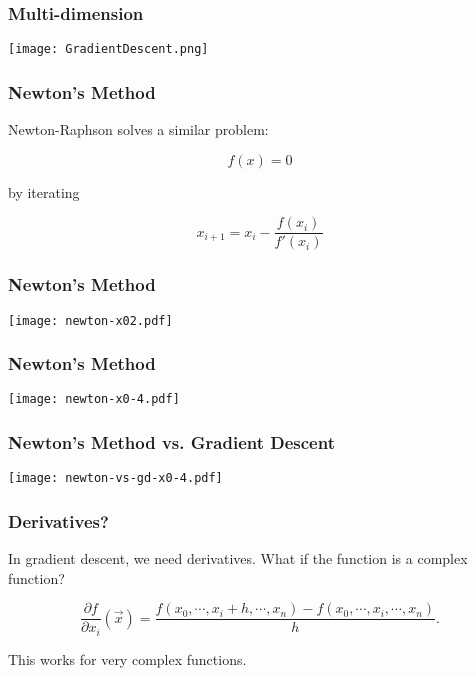 \begin{frame}[fragile]
\frametitle{Multi-dimension}

\centering
\texttt{[image: GradientDescent.png]}

\end{frame}

\begin{frame}[fragile]
\frametitle{Newton's Method}

Newton-Raphson solves a similar problem:

\[
f(x) = 0
\]

by iterating

\[
x_{i+1} = x_i - \frac{f(x_i)}{f'(x_{i})}
\]


\end{frame}

\begin{frame}[fragile]
\frametitle{Newton's Method}

\centering
\texttt{[image: newton-x02.pdf]}

\end{frame}

\begin{frame}[fragile]
\frametitle{Newton's Method}

\centering
\texttt{[image: newton-x0-4.pdf]}

\end{frame}

\begin{frame}[fragile]
\frametitle{Newton's Method vs. Gradient Descent}

\centering
\texttt{[image: newton-vs-gd-x0-4.pdf]}

\end{frame}

\begin{frame}[fragile]
\frametitle{Derivatives?}

In gradient descent, we need \alert{derivatives}. What if the function is a complex function?

\pause

\[
\frac{\partial f}{\partial x_i}(\vec{x}) = \frac{f(x_0,\cdots,x_i+h,\cdots,x_n) - f(x_0,\cdots,x_i,\cdots,x_n)}{h}.
\]

This works for very complex functions.
\end{frame}

